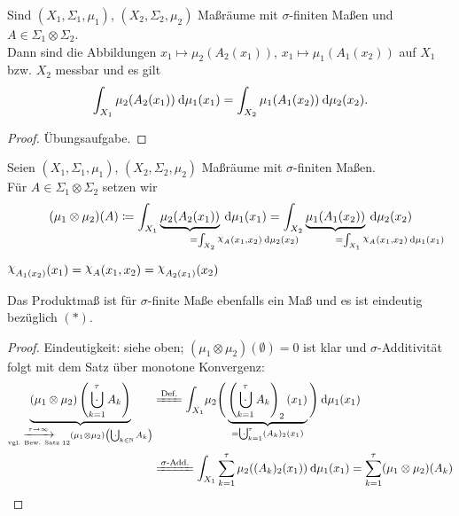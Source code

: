 \documentclass[skript.tex]{subfiles}
\begin{document}
	\begin{theorem}
		Sind $(X_1,\Sigma_1,\mu_1)$, $(X_2,\Sigma_2,\mu_2)$ Maßräume mit $\sigma$-finiten Maßen und $A \in \Sigma_1 \otimes \Sigma_2$. \\
		Dann sind die Abbildungen $x_1 \mapsto \mu_2(A_2(x_1))$, $x_1 \mapsto \mu_1(A_1(x_2))$ auf $X_1$ bzw. $X_2$ messbar und es gilt
		\[
			\int_{X_1} \mu_2(A_2(x_1)) \: \mathrm{d} \mu_1(x_1)
			= \int_{X_2} \mu_1(A_1(x_2)) \: \mathrm{d} \mu_2(x_2).
		\]
	\end{theorem}
	\begin{proof}
		Übungsaufgabe.
	\end{proof}

	\begin{defin}
		Seien $(X_1,\Sigma_1,\mu_1)$, $(X_2,\Sigma_2,\mu_2)$ Maßräume mit $\sigma$-finiten Maßen. \\
		Für $A \in \Sigma_1 \otimes \Sigma_2$ setzen wir
		\[
			(\mu_1 \otimes \mu_2)(A) \coloneqq
			\int_{X_1} \underbrace{\mu_2(A_2(x_1))}_{\mathrlap{
				= \int_{X_2} \rchi_A(x_1,x_2) \md \mu_2(x_2)
			}} \md \mu_1(x_1)
			= \int_{X_2} \underbrace{\mu_1(A_1(x_2))}_{\mathrlap{
					= \int_{X_1} \rchi_A(x_1,x_2) \md \mu_1(x_1)
			}} \md \mu_2(x_2)
		\]
	\end{defin}
	\begin{bem*}
		$\rchi_{A_1(x_2)}(x_1) = \rchi_A(x_1,x_2)= \rchi_{A_2(x_1)}(x_2)$
	\end{bem*}

	\begin{lem}
		Das Produktmaß ist für $\sigma$-finite Maße ebenfalls ein Maß und es ist eindeutig bezüglich $(\ast)$.
	\end{lem}
	\begin{proof}
		Eindeutigkeit: siehe oben; $(\mu_1 \otimes \mu_2)(\emptyset) = 0$ ist klar und $\sigma$-Additivität folgt mit dem Satz über monotone Konvergenz:
		\begin{align*}
			\underbrace{
				(\mu_1 \otimes \mu_2)\left(\bigcupdot_{k=1}^\tau A_k\right)
			}_{\underset{\text{vgl. Bew. Satz 12}}{\xrightarrow{\tau \to\infty}}
				(\mu_1 \otimes \mu_2)\left(\bigcupdot_{k\in\N} A_k\right)
			}
			&\xlongequal{\text{Def.}}
			\mathlarger\int_{X_1} \mu_2 \Bigg(\underbrace{
				\left(\bigcupdot_{k=1}^\tau A_k\right)_2 (x_1)
			}_{=\bigcupdot_{k=1}^\tau (A_k)_2 (x_1)}
			\Bigg) \md \mu_1(x_1) \\
			&\xlongequal{\text{$\sigma$-Add.}}
			\mathlarger\int_{X_1}\sum_{k=1}^\tau \mu_2((A_k)_2(x_1)) \md \mu_1(x_1)
			= \sum_{k=1}^\tau (\mu_1\otimes\mu_2)(A_k)
		\end{align*}
	\end{proof}
\end{document}
